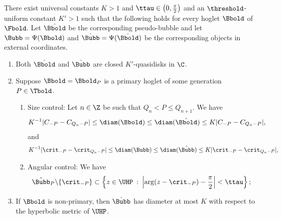 \documentclass{amsart}
\begin{document}
\begin{proposition}
\label{prop:bubble-bounds}
    There exist universal constants $K >1$ and $\ttau \in \left( 0,\frac{\pi}{2} \right)$ and an $\threshold$-uniform constant $K' >1$ such that the following holds for every hoglet $\Bbold$ of $\Fbold$.
    Let $\hat{\Bbold}$ be the corresponding pseudo-bubble and let $\Bubb = \Psi(\Bbold)$ and $\hat{\Bubb} = \Psi(\hat{\Bbold})$ be the corresponding objects in external coordinates.
    \begin{enumerate}
        \item Both $\hat{\Bbold}$ and $\hat{\Bubb}$ are closed $K'$-quasidisks in $\C$.
        \item Suppose $\Bbold=\Bbold_P$ is a primary hoglet of some generation $P \in \Tbold$.
        \begin{enumerate}[label=\textnormal{(\alph*)}]
            \item Size control: Let $n \in \Z$ be such that $Q_n < P \leq Q_{n+1}$. We have
            \[
                K^{-1} |C_{-P} - C_{Q_n-P}| \leq \diam(\Bbold) \leq \diam(\hat{\Bbold}) \leq K|C_{-P} - C_{Q_n-P}|,
            \]
            and 
            \[
                K^{-1} |\crit_{-P} - \crit_{Q_n-P}| \leq \diam(\Bubb) \leq \diam(\hat{\Bubb}) \leq K|\crit_{-P} - \crit_{Q_n-P}|,
            \]
            \item Angular control: We have 
        \[
            \hat{\Bubb}_P \backslash \{\crit_{-P}\} \subset \left\{ z \in \UHP \: : \: \left| \arg(z-\crit_{-P}) - \frac{\pi}{2} \right| < \ttau \right\};
        \]
        \end{enumerate}
        \item If $\Bbold$ is non-primary, then $\hat{\Bubb}$ has diameter at most $K$ with respect to the hyperbolic metric of $\UHP$.
    \end{enumerate} 
\end{proposition}
\end{document}
